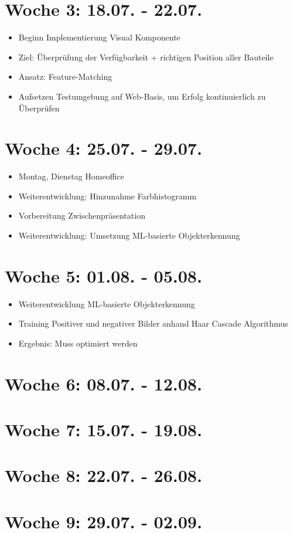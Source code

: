 \section*{Woche 3: 18.07. - 22.07.}
\begin{itemize}
    \item Beginn Implementierung Visual Komponente
    \item Ziel: Überprüfung der Verfügbarkeit + richtigen Position aller Bauteile
    \item Ansatz: Feature-Matching
    \item Aufsetzen Testumgebung auf Web-Basis, um Erfolg kontinuierlich zu Überprüfen
\end{itemize}
\section*{Woche 4: 25.07. - 29.07.}
    \begin{itemize}
        \item {Montag, Dienstag Homeoffice}
        \item Weiterentwicklung: Hinzunahme Farbhistogramm
        \item Vorbereitung Zwischenpräsentation
        \item Weiterentwicklung: Umsetzung ML-basierte Objekterkennung
    \end{itemize}
\section*{Woche 5: 01.08. - 05.08.}
    \begin{itemize}
        \item Weiterentwicklung ML-basierte Objekterkennung
        \item Training Positiver und negativer Bilder anhand Haar Cascade Algorithmus
        \item Ergebnis: Muss optimiert werden
    \end{itemize}
\section*{Woche 6: 08.07. - 12.08.}
\section*{Woche 7: 15.07. - 19.08.}
\section*{Woche 8: 22.07. - 26.08.}
\section*{Woche 9: 29.07. - 02.09.}
